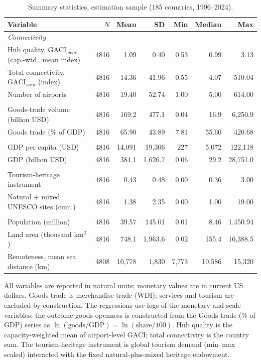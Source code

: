 \begin{table}[H]
\centering
\caption{Summary statistics, estimation sample (185 countries, 1996--2024).}
\label{tab:sumstat}
\begin{threeparttable}
\small
\begin{tabular}{lrrrrrr}
\toprule
Variable & $N$ & Mean & SD & Min & Median & Max \\
\midrule
\multicolumn{7}{l}{\emph{Connectivity}}\\
Hub quality, $\mathrm{GACI}_{cwm}$ (cap.-wtd.\ mean index) & 4816 & 1.09 & 0.40 & 0.53 & 0.99 & 3.13 \\
Total connectivity, $\mathrm{GACI}_{sum}$ (index) & 4816 & 14.36 & 41.96 & 0.55 & 4.07 & 510.04 \\
Number of airports & 4816 & 19.40 & 52.74 & 1.00 & 5.00 & 614.00 \\
\addlinespace
\multicolumn{7}{l}{\emph{Trade outcomes}}\\
Goods-trade volume (billion USD) & 4816 & 169.2 & 477.1 & 0.04 & 16.9 & 6{,}250.9 \\
Goods trade (\% of GDP) & 4816 & 65.90 & 43.89 & 7.81 & 55.60 & 420.68 \\
\addlinespace
\multicolumn{7}{l}{\emph{Income}}\\
GDP per capita (USD) & 4816 & 14{,}091 & 19{,}306 & 227 & 5{,}072 & 122{,}118 \\
GDP (billion USD) & 4816 & 384.1 & 1{,}626.7 & 0.06 & 29.2 & 28{,}751.0 \\
\addlinespace
\multicolumn{7}{l}{\emph{Instrument and heritage}}\\
Tourism-heritage instrument & 4816 & 0.43 & 0.48 & 0.00 & 0.36 & 3.00 \\
Natural + mixed UNESCO sites (cum.) & 4816 & 1.38 & 2.35 & 0.00 & 1.00 & 19.00 \\
\addlinespace
\multicolumn{7}{l}{\emph{Controls}}\\
Population (million) & 4816 & 39.57 & 145.01 & 0.01 & 8.46 & 1{,}450.94 \\
Land area (thousand km$^2$) & 4816 & 748.1 & 1{,}963.6 & 0.02 & 155.4 & 16{,}388.5 \\
Remoteness, mean sea distance (km) & 4808 & 10{,}778 & 1{,}830 & 7{,}773 & 10{,}586 & 15{,}320 \\
\bottomrule
\end{tabular}
\begin{tablenotes}\small
\item All variables are reported in natural units; monetary values are in
current US dollars. Goods trade is merchandise trade (WDI); services and
tourism are excluded by construction. The regressions use logs of the
monetary and scale variables; the outcome goods openness is constructed from
the Goods trade (\% of GDP) series as
$\ln(\text{goods}/\text{GDP})=\ln(\text{share}/100)$. Hub quality is the
capacity-weighted mean of airport-level
GACI; total connectivity is the country sum. The tourism-heritage instrument is
global tourism demand (min--max scaled) interacted with the fixed
natural-plus-mixed heritage endowment.
\end{tablenotes}
\end{threeparttable}
\end{table}


